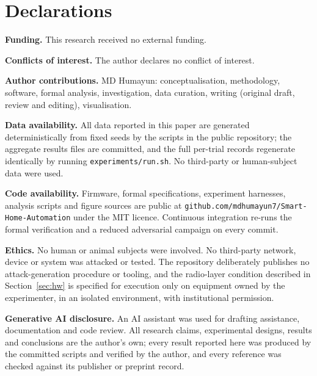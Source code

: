 \section*{Declarations}
\noindent\textbf{Funding.} This research received no external funding.

\noindent\textbf{Conflicts of interest.} The author declares no conflict of interest.

\noindent\textbf{Author contributions.} MD Humayun: conceptualisation, methodology, software,
formal analysis, investigation, data curation, writing (original draft, review and editing),
visualisation.

\noindent\textbf{Data availability.} All data reported in this paper are generated
deterministically from fixed seeds by the scripts in the public repository; the aggregate
results files are committed, and the full per-trial records regenerate identically by running
\texttt{experiments/run.sh}. No third-party or human-subject data were used.

\noindent\textbf{Code availability.} Firmware, formal specifications, experiment harnesses,
analysis scripts and figure sources are public at
\texttt{github.com/mdhumayun7/}\linebreak[0]\texttt{Smart-Home-Automation} under the MIT
licence. Continuous
integration re-runs the formal verification and a reduced adversarial campaign on every commit.

\noindent\textbf{Ethics.} No human or animal subjects were involved. No third-party network,
device or system was attacked or tested. The repository deliberately publishes no
attack-generation procedure or tooling, and the radio-layer condition described in
Section~\ref{sec:hw} is specified for execution only on equipment owned by the experimenter, in
an isolated environment, with institutional permission.

\noindent\textbf{Generative AI disclosure.} An AI assistant was used for drafting assistance,
documentation and code review. All research claims, experimental designs, results and
conclusions are the author's own; every result reported here was produced by the committed
scripts and verified by the author, and every reference was checked against its publisher or
preprint record.

